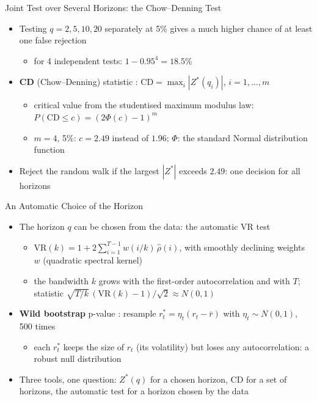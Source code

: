 \begin{frame}{Joint Test over Several Horizons: the Chow--Denning Test}
\itemsize{\small}
\begin{itemize}
    \item Testing $q = 2, 5, 10, 20$ separately at 5\% gives a much higher chance of at least one false rejection
    \begin{itemize}
        \item for 4 independent tests: $1 - 0.95^4 = 18.5\%$
    \end{itemize}
    \item \textbf{CD} (Chow--Denning) statistic : $\mathrm{CD} = \max_{i} |Z^*(q_i)|$, $i = 1, \dots, m$
    \begin{itemize}
        \item critical value from the studentised maximum modulus law: $P(\mathrm{CD} \le c) = (2\Phi(c) - 1)^m$
        \item $m = 4$, 5\%: $c = 2.49$ instead of $1.96$; $\Phi$: the standard Normal distribution function
    \end{itemize}
    \item Reject the random walk if the largest $|Z^*|$ exceeds $2.49$: one decision for all horizons
\end{itemize}
\end{frame}

\begin{frame}{An Automatic Choice of the Horizon}
\itemsize{\small}
\begin{itemize}
    \item The horizon $q$ can be chosen from the data: the automatic VR test 
    \begin{itemize}
        \item $\mathrm{VR}(k) = 1 + 2\sum_{i=1}^{T-1} w(i/k)\,\hat\rho(i)$, with smoothly declining weights $w$ (quadratic spectral kernel) 
        \item the bandwidth $k$ grows with the first-order autocorrelation and with $T$; statistic $\sqrt{T/k}\,(\mathrm{VR}(k) - 1)/\sqrt2 \approx N(0, 1)$
    \end{itemize}
    \item \textbf{Wild bootstrap} p-value : resample $r_t^* = \eta_t(r_t - \bar r)$ with $\eta_t \sim N(0, 1)$, 500 times
    \begin{itemize}
        \item each $r_t^*$ keeps the size of $r_t$ (its volatility) but loses any autocorrelation: a robust null distribution
    \end{itemize}
    \item Three tools, one question: $Z^*(q)$ for a chosen horizon, CD for a set of horizons, the automatic test for a horizon chosen by the data
\end{itemize}
\end{frame}

